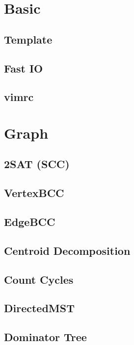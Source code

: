 \section{Basic}
\subsection{Template}

\subsection{Fast IO}

\subsection{vimrc}


\section{Graph}
\subsection{2SAT (SCC)}

\subsection{VertexBCC}

\subsection{EdgeBCC}

\subsection{Centroid Decomposition}

\subsection{Count Cycles}

\subsection{DirectedMST}

\subsection{Dominator Tree}

